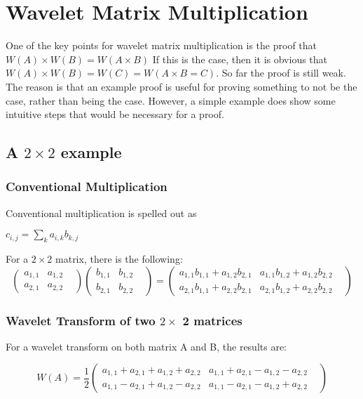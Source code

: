 
\section {Wavelet Matrix Multiplication}

One of the key points for wavelet matrix multiplication is the proof that $W(A) \times W(B) = W(A\times B)$  If this is the case, then it is obvious that $W(A) \times W(B) = W(C) = W(A\times B = C)$.  So far the proof is still weak.  The reason is that an example proof is useful for proving something to not be the case, rather than being the case.   However, a simple example does show some intuitive steps that would be necessary for a proof.  

\subsection{A $2\times 2$ example}
\subsubsection{Conventional Multiplication}

Conventional multiplication is spelled out as

$c_{i,j} = \sum\limits_k a_{i,k} b_{k,j}$

For a $2 \times 2$ matrix, there is the following:
\[
\left(
\begin{array}{ccc}
  a_{1,1}&  a_{1,2} &   \\
 a_{2,1} &  a_{2,2} &   
\end{array}
\right)
\left(
\begin{array}{ccc}
  b_{1,1}&  b_{1,2} &   \\
 b_{2,1} &  b_{2,2} &   
\end{array}
\right) =
\left(
\begin{array}{ccc}
  a_{1,1} b_{1,1} + a_{1,2} b_{2,1}&  a_{1,1}b_{1,2} + a_{1,2}  b_{2,2} &   \\
 a_{2,1} b_{1,1} + a_{2,2} b_{2,1} &  a_{2,1} b_{1,2} + a_{2,2} b_{2,2} &   
\end{array}
\right)
\]

\subsubsection{Wavelet Transform of two $2\times$ 2 matrices}

For a wavelet transform on both matrix A and B, the results are:

\[
W(A) = \frac{1}{2} \left(
\begin{array}{ccc}
  a_{1,1} + a_{2,1} + a_{1,2} + a_{2,2} &  a_{1,1} + a_{2,1} - a_{1,2} - a_{2,2} &   \\
 a_{1,1} - a_{2,1} + a_{1,2} - a_{2,2} &  a_{1,1} - a_{2,1} - a_{1,2} + a_{2,2} &   
\end{array}
\right)
\]

